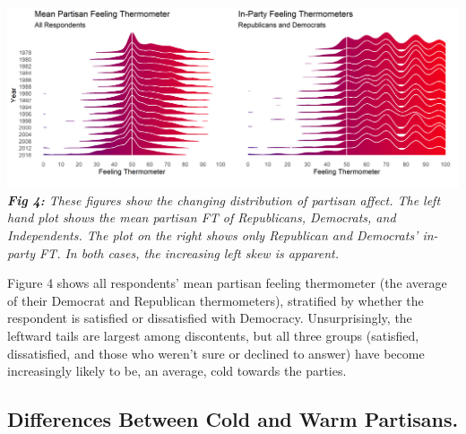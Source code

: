 \documentclass[
  12,
]{paper}
\begin{document}
\includegraphics{fig/gg-ridge-grid.png} \emph{\textbf{Fig 4:} These
figures show the changing distribution of partisan affect. The left hand
plot shows the mean partisan FT of Republicans, Democrats, and
Independents. The plot on the right shows only Republican and Democrats'
in-party FT. In both cases, the increasing left skew is apparent.}

Figure 4 shows all respondents' mean partisan feeling thermometer (the
average of their Democrat and Republican thermometers), stratified by
whether the respondent is satisfied or dissatisfied with Democracy.
Unsurprisingly, the leftward tails are largest among discontents, but
all three groups (satisfied, dissatisfied, and those who weren't sure or
declined to answer) have become increasingly likely to be, an average,
cold towards the parties.

\hypertarget{differences-between-cold-and-warm-partisans.}{%
\subsection{Differences Between Cold and Warm
Partisans.}\label{differences-between-cold-and-warm-partisans.}}
\end{document}
